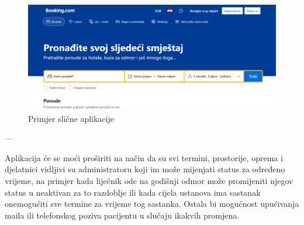 		\begin{figure}[H]
			\includegraphics[scale=0.4]{slike/slicna_aplikacija.PNG} %
			\centering
			\caption{Primjer slične aplikacije}
			\label{fig:booking}
		\end{figure}
		
		---
		
		Aplikacija će se moći proširiti na način da su svi termini, prostorije, oprema i djelatnici vidljivi su administratoru koji im može mijenjati status za određeno vrijeme, na primjer kada liječnik ode na godišnji odmor može promijeniti njegov status u neaktivan za to razdoblje ili kada cijela ustanova ima sastanak onemogućiti sve termine za vrijeme tog sastanka. Ostala bi mogućnost upućivanja maila ili telefonskog poziva pacijentu u slučaju ikakvih promjena.
		
	
		\eject
		
				
	